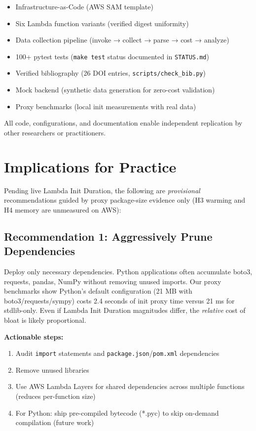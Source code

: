 \begin{itemize}
    \item Infrastructure-as-Code (AWS SAM template)
    \item Six Lambda function variants (verified digest uniformity)
    \item Data collection pipeline (invoke → collect → parse → cost → analyze)
    \item 100+ pytest tests (\texttt{make test} status documented in \texttt{STATUS.md})
    \item Verified bibliography (26 DOI entries, \texttt{scripts/check\_bib.py})
    \item Mock backend (synthetic data generation for zero-cost validation)
    \item Proxy benchmarks (local init measurements with real data)
\end{itemize}

All code, configurations, and documentation enable independent replication by other researchers or practitioners.

\section{Implications for Practice}

Pending live Lambda Init Duration, the following are \textit{provisional} recommendations guided by proxy package-size evidence only (H3 warming and H4 memory are unmeasured on AWS):

\subsection{Recommendation 1: Aggressively Prune Dependencies}

Deploy only necessary dependencies. Python applications often accumulate boto3, requests, pandas, NumPy without removing unused imports. Our proxy benchmarks show Python's default configuration (21 MB with boto3/requests/sympy) costs 2.4 seconds of init proxy time versus 21 ms for stdlib-only. Even if Lambda Init Duration magnitudes differ, the \textit{relative} cost of bloat is likely proportional.

\textbf{Actionable steps:}
\begin{enumerate}
    \item Audit \texttt{import} statements and \texttt{package.json}/\texttt{pom.xml} dependencies
    \item Remove unused libraries
    \item Use AWS Lambda Layers for shared dependencies across multiple functions (reduces per-function size)
    \item For Python: ship pre-compiled bytecode (*.pyc) to skip on-demand compilation (future work)
\end{enumerate}

